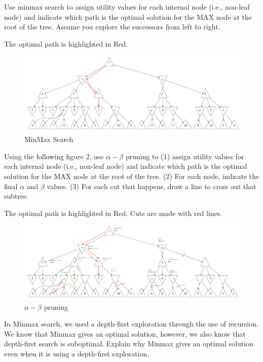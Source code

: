 \documentclass[12pt]{article}
\begin{document}
\thispagestyle{empty}

\problem Use minmax search to assign utility values for each internal node (i.e., non-leaf node) and indicate which path is the optimal solution for the MAX node at the root of the tree. Assume you explore the successors from left to right.

\solution
The optimal path is highlighted in Red.
\begin{figure}[!ht]
    \centering
    \includegraphics[width=\textwidth]{Images/Question 1.png}
    \caption{MinMax Search}
\end{figure}

\newpage
\problem Using the following figure 2, use $\alpha-\beta$ pruning to (1) assign utility values for each internal node (i.e., non-leaf node) and indicate which path is the optimal solution for the MAX node at the root of the tree. (2) For each node, indicate the final $\alpha$ and $\beta$ values. (3) For each cut that happens, draw a line to cross out that subtree.

\solution
The optimal path is highlighted in Red. Cuts are made with red lines.
\begin{figure}[!ht]
    \centering
    \includegraphics[width=\textwidth]{Images/Question 2.png}
    \caption{$\alpha-\beta$ pruning}
\end{figure}

\problem In Minmax search, we used a depth-first exploration through the use of recursion. We know that Minmax gives an optimal solution, however, we also know that depth-first search is suboptimal. Explain why Minmax gives an optimal solution even when it is using a depth-first exploration.
\end{document}
